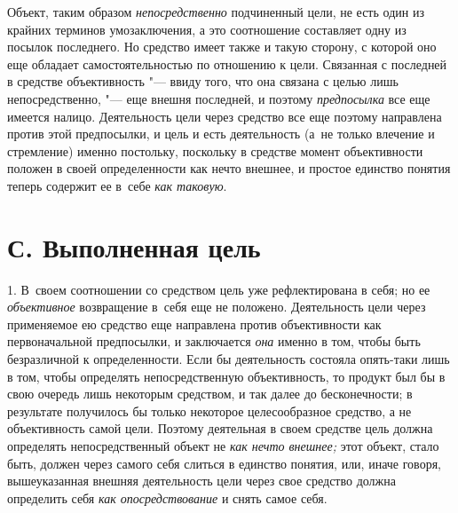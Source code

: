 Объект, таким образом
{\em непосредственно}
подчиненный цели, не есть один из крайних терминов
умозаключения, а это соотношение составляет одну из посылок последнего. Но
средство имеет также и такую сторону, с которой оно еще обладает
самостоятельностью по отношению к цели. Связанная с последней в средстве
объективность "--- ввиду того, что она связана с целью лишь
непосредственно, "--- еще внешня последней, и поэтому
{\em предпосылка} все еще
имеется налицо. Деятельность цели через средство все еще поэтому направлена
против этой предпосылки, и цель и есть деятельность (а~не только влечение и
стремление) именно постольку, поскольку в средстве момент объективности
положен в своей определенности как нечто внешнее, и простое единство
понятия теперь содержит ее в~себе
{\em как таковую}.

\section[С. Выполненная цель]{С. Выполненная цель}

1. В~своем соотношении со средством цель уже рефлектирована в
себя; но ее {\em объективное}
возвращение в~себя еще не положено. Деятельность цели через
применяемое ею средство еще направлена против объективности как
первоначальной предпосылки, и заключается
{\em она} именно в том,
чтобы быть безразличной к определенности. Если бы деятельность состояла
опять-таки лишь в том, чтобы определять непосредственную объективность, то
продукт был бы в свою очередь лишь некоторым средством, и так далее до
бесконечности; в результате получилось бы только некоторое целесообразное
средство, а не объективность самой цели. Поэтому деятельная в своем
средстве цель должна определять непосредственный объект не
{\em как нечто внешнее;}
этот объект, стало быть, должен через самого себя слиться в
единство понятия, или, иначе говоря, вышеуказанная внешняя деятельность
цели через свое средство должна определить себя
{\em как опосредствование} и снять самое себя.

